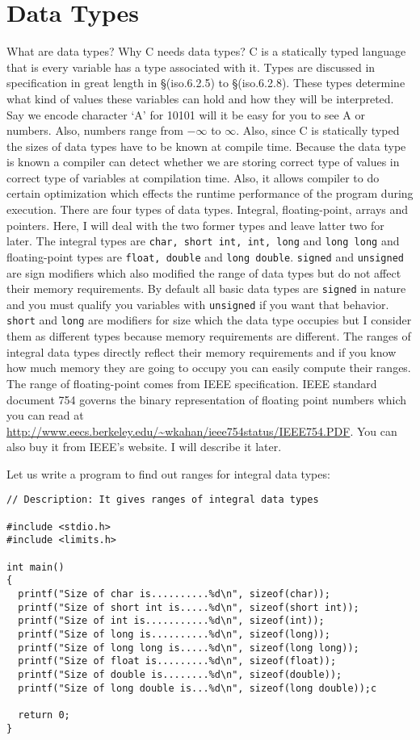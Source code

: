 \section{Data Types}
What are data types? Why C needs data types? C is a statically typed language
that is every variable has a type associated with it. Types are discussed in
specification in great length in \S(iso.6.2.5) to \S(iso.6.2.8).
These types determine
what kind of values these variables can hold and how they will be interpreted.
Say we encode
character `A' for 10101 will it be easy for you to see A or numbers. Also,
numbers range from $-\infty$ to $\infty$. Also, since C is statically typed the
sizes of data types have to be known at compile time. Because the data type is
known a compiler can detect whether we are storing correct type of values in
correct type of variables at compilation time. Also, it allows compiler to do
certain optimization which effects the runtime performance of the program
during execution. There are four types of
data types. Integral, floating-point, arrays and pointers. Here, I will deal
with the two former types and leave latter two for later. The integral types
are \texttt{char, short int, int, long} and \texttt{long long} and
floating-point types are \texttt{float, double} and \texttt{long
  double}. \texttt{signed} and \texttt{unsigned} are sign modifiers which also
modified the range of data types but do not affect their memory
requirements. By default all basic data types are \texttt{signed} in nature and
you must qualify you variables with \texttt{unsigned} if you want that
behavior. \texttt{short} and \texttt{long} are modifiers for size which the
data type occupies but I consider them as different types because memory
requirements are different. The ranges of integral data types directly reflect
their memory requirements and if you know how much memory they are going to
occupy you can easily compute their ranges. The range of floating-point comes
from IEEE specification. IEEE standard document 754 governs the binary
representation of floating point numbers which you can read at
\url{http://www.eecs.berkeley.edu/~wkahan/ieee754status/IEEE754.PDF}. You can
also buy it from IEEE's website. I will describe it later.

Let us write a program to find out ranges for integral data types:

\begin{verbatim}
// Description: It gives ranges of integral data types

#include <stdio.h>
#include <limits.h>

int main()
{
  printf("Size of char is..........%d\n", sizeof(char));
  printf("Size of short int is.....%d\n", sizeof(short int));
  printf("Size of int is...........%d\n", sizeof(int));
  printf("Size of long is..........%d\n", sizeof(long));
  printf("Size of long long is.....%d\n", sizeof(long long));
  printf("Size of float is.........%d\n", sizeof(float));
  printf("Size of double is........%d\n", sizeof(double));
  printf("Size of long double is...%d\n", sizeof(long double));c

  return 0;
}
\end{verbatim}

